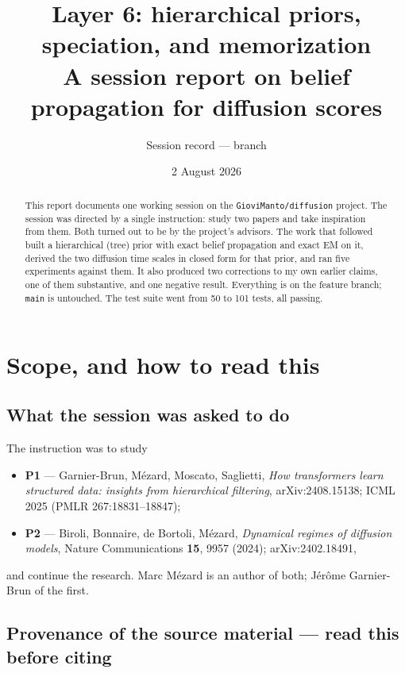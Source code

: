 \documentclass[11pt]{article}
\title{\textbf{Layer 6: hierarchical priors, speciation, and memorization}\\[2mm]
\large A session report on belief propagation for diffusion scores}
\author{Session record --- branch \code{claude/em-bp-denoiser-learning-e07ike}}
\date{2 August 2026}
\theoremstyle{remark}
\newcommand{\code}[1]{\texttt{\small #1}}
\begin{document}
\maketitle

\begin{abstract}
\noindent
This report documents one working session on the \code{GioviManto/diffusion}
project. The session was directed by a single instruction: study two papers and
take inspiration from them. Both turned out to be by the project's advisors.
The work that followed built a hierarchical (tree) prior with exact belief
propagation and exact EM on it, derived the two diffusion time scales in closed
form for that prior, and ran five experiments against them. It also produced two
corrections to my own earlier claims, one of them substantive, and one negative
result. Everything is on the feature branch; \code{main} is untouched. The test
suite went from 50 to 101 tests, all passing.
\end{abstract}

\tableofcontents

\section{Scope, and how to read this}

\subsection{What the session was asked to do}

The instruction was to study
\begin{itemize}[nosep]
  \item \textbf{P1} --- Garnier-Brun, M\'ezard, Moscato, Saglietti, \emph{How
    transformers learn structured data: insights from hierarchical filtering},
    arXiv:2408.15138; ICML 2025 (PMLR 267:18831--18847);
  \item \textbf{P2} --- Biroli, Bonnaire, de Bortoli, M\'ezard, \emph{Dynamical
    regimes of diffusion models}, Nature Communications \textbf{15}, 9957
    (2024); arXiv:2402.18491,
\end{itemize}
and continue the research. Marc M\'ezard is an author of both; J\'er\^ome
Garnier-Brun of the first.

\subsection{Provenance of the source material --- read this before citing}
\end{document}
